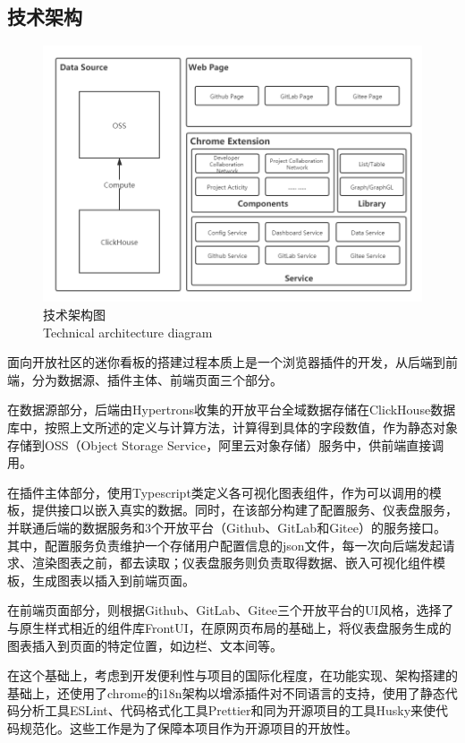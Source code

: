 \subsection{技术架构}
\begin{figure}[H]
    \centering
    \includegraphics[width=150mm]{./figures/image5-1.png}
    \caption{技术架构图\\Technical architecture diagram}
\end{figure}
\par 面向开放社区的迷你看板的搭建过程本质上是一个浏览器插件的开发，从后端到前端，分为数据源、插件主体、前端页面三个部分。
\par 在数据源部分，后端由Hypertrons收集的开放平台全域数据存储在ClickHouse数据库中，按照上文所述的定义与计算方法，计算得到具体的字段数值，作为静态对象存储到OSS（Object Storage Service，阿里云对象存储）服务中，供前端直接调用。
\par 在插件主体部分，使用Typescript类定义各可视化图表组件，作为可以调用的模板，提供接口以嵌入真实的数据。同时，在该部分构建了配置服务、仪表盘服务，并联通后端的数据服务和3个开放平台（Github、GitLab和Gitee）的服务接口。其中，配置服务负责维护一个存储用户配置信息的json文件，每一次向后端发起请求、渲染图表之前，都去读取；仪表盘服务则负责取得数据、嵌入可视化组件模板，生成图表以插入到前端页面。
\par 在前端页面部分，则根据Github、GitLab、Gitee三个开放平台的UI风格，选择了与原生样式相近的组件库FrontUI，在原网页布局的基础上，将仪表盘服务生成的图表插入到页面的特定位置，如边栏、文本间等。

\par 在这个基础上，考虑到开发便利性与项目的国际化程度，在功能实现、架构搭建的基础上，还使用了chrome的i18n架构以增添插件对不同语言的支持，使用了静态代码分析工具ESLint、代码格式化工具Prettier和同为开源项目的工具Husky来使代码规范化。这些工作是为了保障本项目作为开源项目的开放性。



